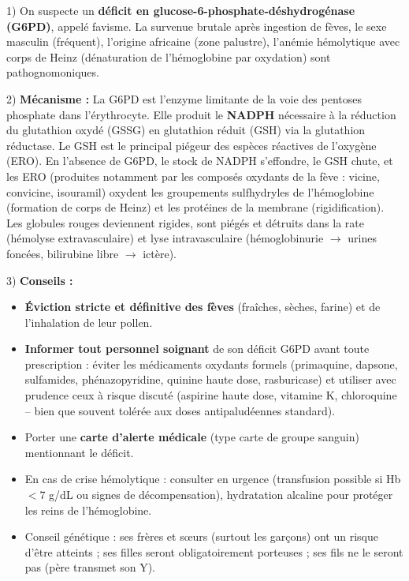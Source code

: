 \documentclass[11pt]{article}
\begin{document}
\begin{corrige}
1) On suspecte un \textbf{déficit en glucose-6-phosphate-déshydrogénase (G6PD)}, appelé favisme. La survenue brutale après ingestion de fèves, le sexe masculin (fréquent), l'origine africaine (zone palustre), l'anémie hémolytique avec corps de Heinz (dénaturation de l'hémoglobine par oxydation) sont pathognomoniques.

2) \textbf{Mécanisme :} La G6PD est l'enzyme limitante de la voie des pentoses phosphate dans l'érythrocyte. Elle produit le \textbf{NADPH} nécessaire à la réduction du glutathion oxydé (GSSG) en glutathion réduit (GSH) via la glutathion réductase. Le GSH est le principal piégeur des espèces réactives de l'oxygène (ERO). En l'absence de G6PD, le stock de NADPH s'effondre, le GSH chute, et les ERO (produites notamment par les composés oxydants de la fève : vicine, convicine, isouramil) oxydent les groupements sulfhydryles de l'hémoglobine (formation de corps de Heinz) et les protéines de la membrane (rigidification). Les globules rouges deviennent rigides, sont piégés et détruits dans la rate (hémolyse extravasculaire) et lyse intravasculaire (hémoglobinurie $\rightarrow$ urines foncées, bilirubine libre $\rightarrow$ ictère).

3) \textbf{Conseils :}
\begin{itemize}
\item \textbf{Éviction stricte et définitive des fèves} (fraîches, sèches, farine) et de l'inhalation de leur pollen.
\item \textbf{Informer tout personnel soignant} de son déficit G6PD avant toute prescription : éviter les médicaments oxydants formels (primaquine, dapsone, sulfamides, phénazopyridine, quinine haute dose, rasburicase) et utiliser avec prudence ceux à risque discuté (aspirine haute dose, vitamine K, chloroquine -- bien que souvent tolérée aux doses antipaludéennes standard).
\item Porter une \textbf{carte d'alerte médicale} (type carte de groupe sanguin) mentionnant le déficit.
\item En cas de crise hémolytique : consulter en urgence (transfusion possible si Hb $< 7$ g/dL ou signes de décompensation), hydratation alcaline pour protéger les reins de l'hémoglobine.
\item Conseil génétique : ses frères et sœurs (surtout les garçons) ont un risque d'être atteints ; ses filles seront obligatoirement porteuses ; ses fils ne le seront pas (père transmet son Y).
\end{itemize}
\end{corrige}
\end{document}
